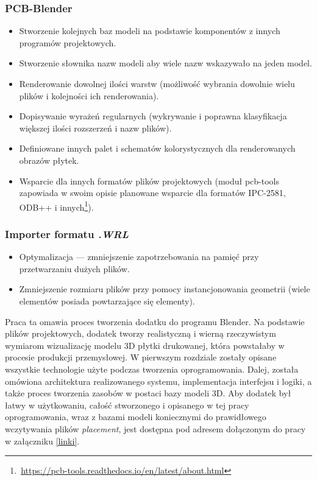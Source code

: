 \documentclass{xmgr}
\begin{document}
\subsubsection{PCB-Blender}
\begin{itemize}
\item Stworzenie kolejnych baz modeli na podstawie komponentów z innych programów projektowych.
\item Stworzenie słownika nazw modeli aby wiele nazw wskazywało na jeden model.
\item Renderowanie dowolnej ilości warstw (możliwość wybrania dowolnie wielu plików i kolejności ich renderowania).
\item Dopisywanie wyrażeń regularnych (wykrywanie i poprawna klasyfikacja większej ilości rozszerzeń i nazw plików).
\item Definiowane innych palet i schematów kolorystycznych dla renderowanych obrazów płytek.
\item Wsparcie dla innych formatów plików projektowych (moduł pcb-tools zapowiada w swoim opisie planowane wsparcie dla formatów IPC-2581, ODB++ i innych\footnote{\,\url{https://pcb-tools.readthedocs.io/en/latest/about.html}}).
\end{itemize}

\subsubsection{Importer formatu \emph{.WRL}}
\begin{itemize}
\item Optymalizacja --- zmniejszenie zapotrzebowania na pamięć przy przetwarzaniu dużych plików.
\item Zmniejszenie rozmiaru plików przy pomocy instancjonowania geometrii (wiele elementów posiada powtarzające się elementy).
\end{itemize}


\summary

Praca ta omawia proces tworzenia dodatku do programu Blender. Na podstawie plików projektowych, dodatek tworzy realistyczną i wierną rzeczywistym wymiarom wizualizację modelu 3D płytki drukowanej, która powstałaby w procesie produkcji przemysłowej. W pierwszym rozdziale zostały opisane wszystkie technologie użyte podczas tworzenia oprogramowania. Dalej, została omówiona architektura realizowanego systemu, implementacja interfejsu i logiki, a także proces tworzenia zasobów w postaci bazy modeli 3D.
Aby dodatek był łatwy w użytkowaniu, całość stworzonego i opisanego w tej pracy oprogramowania, wraz z bazami modeli koniecznymi do prawidłowego wczytywania plików \emph{placement}, jest dostępna pod adresem dołączonym do pracy w załączniku \ref{linki}. 
\end{document}
